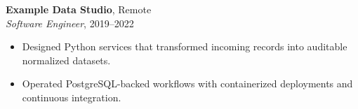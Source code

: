 \textbf{Example Data Studio}, Remote\\
\textit{Software Engineer}, 2019--2022
\begin{itemize}
  \item[--] Designed Python services that transformed incoming records into auditable normalized datasets.
  \item[--] Operated PostgreSQL-backed workflows with containerized deployments and continuous integration.
\end{itemize}
